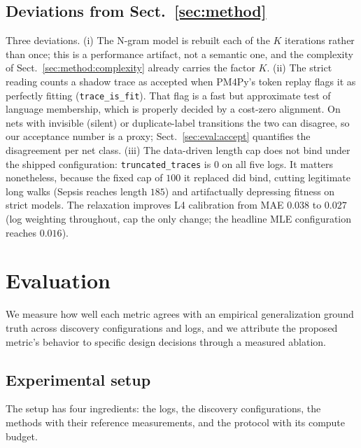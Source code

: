 \documentclass[runningheads]{llncs}
\newcommand{\chg}[1]{#1}
\begin{document}
\subsection{Deviations from Sect.~\ref{sec:method}}
\label{sec:impl:deviations}
Three deviations. (i) The N-gram model is rebuilt each of the $K$ iterations rather than once; this is a performance artifact, not a semantic one, and the complexity of Sect.~\ref{sec:method:complexity} already carries the factor $K$. (ii) The strict reading counts a shadow trace as accepted when PM4Py's token replay flags it as perfectly fitting (\texttt{trace\_is\_fit}). That flag is a fast but approximate test of language membership, which is properly decided by a cost-zero alignment. On nets with invisible (silent) or duplicate-label transitions the two can disagree, so our acceptance number is a proxy\chg{; Sect.~\ref{sec:eval:accept} quantifies the disagreement per net class}. (iii) \chg{The data-driven length cap does not bind under the shipped configuration: \texttt{truncated\_traces} is $0$ on all five logs. It matters nonetheless, because the fixed cap of $100$ it replaced did bind, cutting legitimate long walks (Sepsis reaches length $185$) and artifactually depressing fitness on strict models. The relaxation improves L4 calibration from MAE $0.038$ to $0.027$ (log weighting throughout, cap the only change; the headline MLE configuration reaches $0.016$).}

\section{Evaluation}
\label{sec:eval}
We measure how well each metric agrees with an empirical generalization ground truth across discovery configurations and logs, and we attribute the proposed metric's behavior to specific design decisions through a measured ablation.

\subsection{Experimental setup}
\label{sec:eval:setup}
The setup has four ingredients: the logs, the discovery configurations, the methods with their reference measurements, and the protocol with its compute budget.
\end{document}
